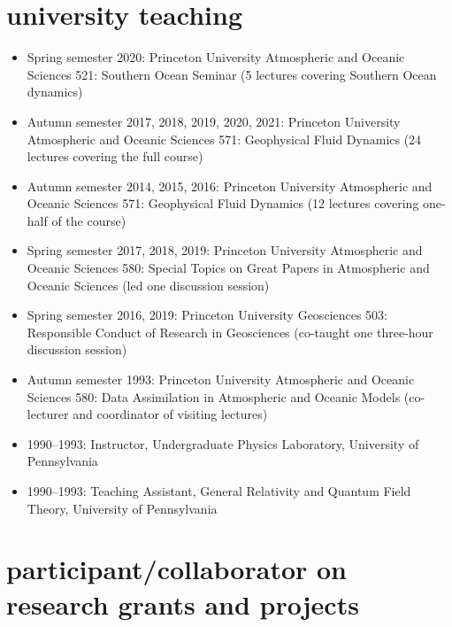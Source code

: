 \documentclass{article}
\begin{document}
\section*{\sc  \color{Maroon}  university teaching}
\vspace{-.3cm}

\begin{itemize}[leftmargin=*]

\item Spring semester 2020: Princeton University Atmospheric and Oceanic Sciences 521: Southern Ocean Seminar (5 lectures covering Southern Ocean dynamics)

\item Autumn semester 2017, 2018, 2019, 2020, 2021: Princeton University Atmospheric and Oceanic Sciences 571: Geophysical Fluid Dynamics (24 lectures covering the full course)

\item Autumn semester 2014, 2015, 2016: Princeton University Atmospheric and Oceanic Sciences 571: Geophysical Fluid Dynamics (12 lectures covering one-half of the course)

\item Spring semester 2017, 2018, 2019: Princeton University Atmospheric and Oceanic Sciences 580: Special Topics on Great Papers in Atmospheric and Oceanic Sciences (led one discussion session)

\item Spring semester 2016, 2019: Princeton University Geosciences 503: Responsible Conduct of Research in Geosciences (co-taught one three-hour discussion session)

\item Autumn semester 1993: Princeton University Atmospheric and Oceanic Sciences 580: Data Assimilation in Atmospheric and Oceanic Models (co-lecturer and coordinator of visiting lectures)

\item 1990--1993:  Instructor, Undergraduate Physics Laboratory, University of Pennsylvania 

\item 1990--1993:  Teaching Assistant,  General Relativity and Quantum Field Theory, University of Pennsylvania 

\end{itemize}


\section*{\sc \color{Maroon}  participant/collaborator on research grants and projects}
\vspace{-.3cm}
\end{document}

